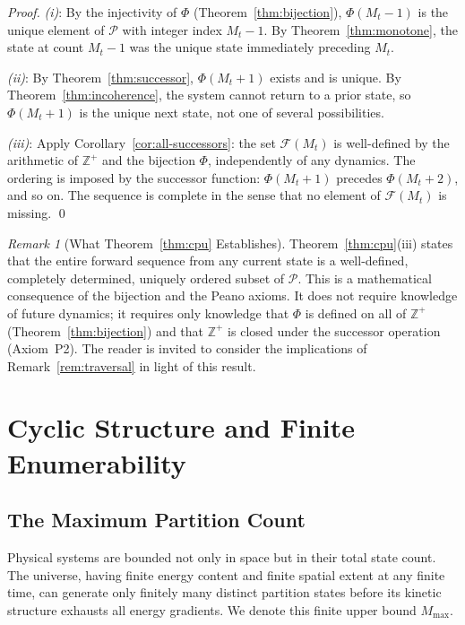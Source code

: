 \documentclass[twocolumn,10pt,a4paper]{article}
\theoremstyle{thmstyle}
\theoremstyle{definition}
\theoremstyle{remark}
\newtheorem{remark}[theorem]{Remark}
\newcommand{\Zp}{\mathbb{Z}^{+}}
\newcommand{\Parts}{\mathcal{P}}
\newcommand{\Mmax}{M_{\max}}
\newcommand{\PhiMap}{\varPhi}
\begin{document}
\begin{proof}
\textit{(i)}: By the injectivity of $\PhiMap$ (Theorem~\ref{thm:bijection}), $\PhiMap(M_t - 1)$ is the unique element of $\Parts$ with integer index $M_t - 1$. By Theorem~\ref{thm:monotone}, the state at count $M_t - 1$ was the unique state immediately preceding $M_t$.

\textit{(ii)}: By Theorem~\ref{thm:successor}, $\PhiMap(M_t + 1)$ exists and is unique. By Theorem~\ref{thm:incoherence}, the system cannot return to a prior state, so $\PhiMap(M_t + 1)$ is the unique next state, not one of several possibilities.

\textit{(iii)}: Apply Corollary~\ref{cor:all-successors}: the set $\mathcal{F}(M_t)$ is well-defined by the arithmetic of $\Zp$ and the bijection $\PhiMap$, independently of any dynamics. The ordering is imposed by the successor function: $\PhiMap(M_t + 1)$ precedes $\PhiMap(M_t + 2)$, and so on. The sequence is complete in the sense that no element of $\mathcal{F}(M_t)$ is missing. \qed
\end{proof}

\begin{remark}[What Theorem~\ref{thm:cpu} Establishes]
Theorem~\ref{thm:cpu}(iii) states that the entire forward sequence from any current state is a well-defined, completely determined, uniquely ordered subset of $\Parts$. This is a mathematical consequence of the bijection and the Peano axioms. It does not require knowledge of future dynamics; it requires only knowledge that $\PhiMap$ is defined on all of $\Zp$ (Theorem~\ref{thm:bijection}) and that $\Zp$ is closed under the successor operation (Axiom~P2). The reader is invited to consider the implications of Remark~\ref{rem:traversal} in light of this result.
\end{remark}

\section{Cyclic Structure and Finite Enumerability}
\label{sec:cyclic}

\subsection{The Maximum Partition Count}

Physical systems are bounded not only in space but in their total state count. The universe, having finite energy content and finite spatial extent at any finite time, can generate only finitely many distinct partition states before its kinetic structure exhausts all energy gradients. We denote this finite upper bound $\Mmax$.
\end{document}
